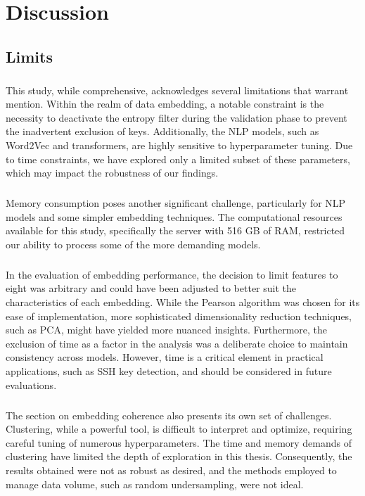 \chapter{Discussion}\label{chap:discussion}




\section{Limits}

\paragraph{}This study, while comprehensive, acknowledges several limitations that warrant mention. Within the realm of data embedding, a notable constraint is the necessity to deactivate the entropy filter during the validation phase to prevent the inadvertent exclusion of keys. Additionally, the NLP models, such as Word2Vec and transformers, are highly sensitive to hyperparameter tuning. Due to time constraints, we have explored only a limited subset of these parameters, which may impact the robustness of our findings.

\paragraph{}Memory consumption poses another significant challenge, particularly for NLP models and some simpler embedding techniques. The computational resources available for this study, specifically the server with 516 GB of RAM, restricted our ability to process some of the more demanding models.

\paragraph{}In the evaluation of embedding performance, the decision to limit features to eight was arbitrary and could have been adjusted to better suit the characteristics of each embedding. While the Pearson algorithm was chosen for its ease of implementation, more sophisticated dimensionality reduction techniques, such as PCA, might have yielded more nuanced insights. Furthermore, the exclusion of time as a factor in the analysis was a deliberate choice to maintain consistency across models. However, time is a critical element in practical applications, such as SSH key detection, and should be considered in future evaluations.

\paragraph{}The section on embedding coherence also presents its own set of challenges. Clustering, while a powerful tool, is difficult to interpret and optimize, requiring careful tuning of numerous hyperparameters. The time and memory demands of clustering have limited the depth of exploration in this thesis. Consequently, the results obtained were not as robust as desired, and the methods employed to manage data volume, such as random undersampling, were not ideal.

